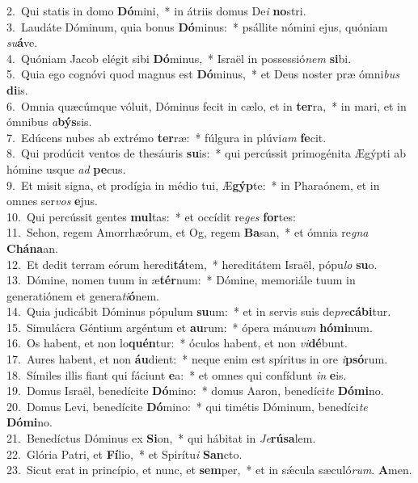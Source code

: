 {2.~}Qui statis in domo \textbf{Dó}mini,~* in átriis domus De\textit{i} \textbf{no}stri.\\
{3.~}Laudáte Dóminum, quia bonus \textbf{Dó}minus:~* psállite nómini ejus, quóniam \textit{su}\textbf{á}ve.\\
{4.~}Quóniam Jacob elégit sibi \textbf{Dó}minus,~* Israël in possessió\textit{nem} \textbf{si}bi.\\
{5.~}Quia ego cognóvi quod magnus est \textbf{Dó}minus,~* et Deus noster præ ómni\textit{bus} \textbf{di}is.\\
{6.~}Omnia quæcúmque vóluit, Dóminus fecit in cælo, et in \textbf{ter}ra,~* in mari, et in ómnibus \textit{a}\textbf{býs}sis.\\
{7.~}Edúcens nubes ab extrémo \textbf{ter}ræ:~* fúlgura in plúvi\textit{am} \textbf{fe}cit.\\
{8.~}Qui prodúcit ventos de thesáuris \textbf{su}is:~* qui percússit primogénita Ægýpti ab hómine usque \textit{ad} \textbf{pe}cus.\\
{9.~}Et misit signa, et prodígia in médio tui, Æ\textbf{gýp}te:~* in Pharaónem, et in omnes ser\textit{vos} \textbf{e}jus.\\
{10.~}Qui percússit gentes \textbf{mul}tas:~* et occídit re\textit{ges} \textbf{for}tes:\\
{11.~}Sehon, regem Amorrhæórum, et Og, regem \textbf{Ba}san,~* et ómnia re\textit{gna} \textbf{Chá}\textbf{na}an.\\
{12.~}Et dedit terram eórum heredi\textbf{tá}tem,~* hereditátem Israël, pópu\textit{lo} \textbf{su}o.\\
{13.~}Dómine, nomen tuum in æ\textbf{tér}num:~* Dómine, memoriále tuum in generatiónem et genera\textit{ti}\textbf{ó}nem.\\
{14.~}Quia judicábit Dóminus pópulum \textbf{su}um:~* et in servis suis de\textit{pre}\textbf{cá}\textbf{bi}tur.\\
{15.~}Simulácra Géntium argéntum et \textbf{au}rum:~* ópera mánu\textit{um} \textbf{hó}\textbf{mi}num.\\
{16.~}Os habent, et non lo\textbf{quén}tur:~* óculos habent, et non \textit{vi}\textbf{dé}bunt.\\
{17.~}Aures habent, et non \textbf{áu}dient:~* neque enim est spíritus in ore \textit{i}\textbf{psó}rum.\\
{18.~}Símiles illis fiant qui fáciunt \textbf{e}a:~* et omnes qui confídunt \textit{in} \textbf{e}is.\\
{19.~}Domus Israël, benedícite \textbf{Dó}mino:~* domus Aaron, benedíci\textit{te} \textbf{Dó}\textbf{mi}no.\\
{20.~}Domus Levi, benedícite \textbf{Dó}mino:~* qui timétis Dóminum, benedíci\textit{te} \textbf{Dó}\textbf{mi}no.\\
{21.~}Benedíctus Dóminus ex \textbf{Si}on,~* qui hábitat in \textit{Je}\textbf{rú}\textbf{sa}lem.\\
{22.~}Glória Patri, et \textbf{Fí}lio,~* et Spirítu\textit{i} \textbf{San}cto.\\
{23.~}Sicut erat in princípio, et nunc, et \textbf{sem}per,~* et in sǽcula sæculó\textit{rum}. \textbf{A}men.\\
